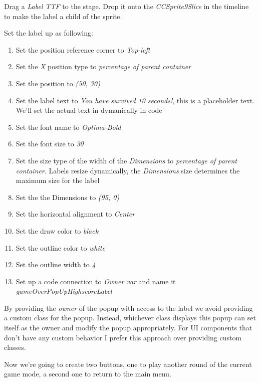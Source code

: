\begin{leftbar}
Drag a \textit{Label TTF} to the stage. Drop it onto the
\textit{CCSprite9Slice} in the timeline to make the label a child of the sprite.

Set the label up as following:
\begin{enumerate}
  \item Set the position reference corner to \textit{Top-left}
  \item Set the \textit{X} position type to \textit{percentage of parent
  container}
  \item Set the position to \textit{(50, 30)}
  \item Set the label text to \textit{You have survived 10 seconds!}, this is a
  placeholder text. We'll set the actual text in dymanically in code
  \item Set the font name to \textit{Optima-Bold}
  \item Set the font size to \textit{30}
  \item Set the size type of the width of the \textit{Dimensions} to
  \textit{percentage of parent container}. Labels resize dynamically, the
  \textit{Dimensions} size determines the maximum size for the label
  \item Set the the Dimensions to \textit{(95, 0)}
  \item Set the horizontal alignment to \textit{Center}
  \item Set the draw color to \textit{black}
  \item Set the outline color to \textit{white}
  \item Set the outline width to \textit{4}
  \item Set up a code connection to \textit{Owner var} and name it
  \textit{gameOverPopUpHighscoreLabel}
\end{enumerate}
\end{leftbar}

By providing the \textit{owner} of the popup with access to the label we avoid
providing a custom class for the popup. Instead, whichever class displays this
popup can set itself as the owner and modify the popup appropriately. For UI
components that don't have any custom behavior I prefer this approach over
providing custom classes.

Now we're going to create two buttons, one to play another round of the current
game mode, a second one to return to the main menu.

